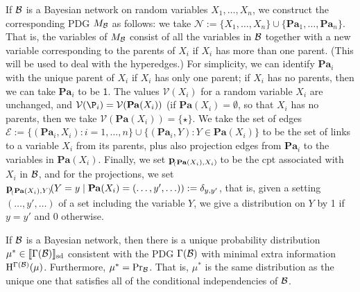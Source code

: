 \documentclass{article}
\DeclarePairedDelimiter{\SD}{\llbracket}{\rrbracket_{\text{sd}}}
\newcommand{\bp}[1][L]{\mat{p}_{\!_#1\!}}
\newcommand{\V}{\mathcal V}
\newcommand{\N}{\mathcal N}
\newcommand{\Ed}{\mathcal E}
\newcommand\Pa{\mathbf{Pa}}
\numberwithin{equation}{section}
\begin{document}
	\begin{defn}\label{def:bn2PDG}
		If $\cal B$ is a Bayesian network on random variables
    $X_1, \ldots, X_n$, we construct the corresponding PDG $M_{\cal B}$ 
                as follows: we take $\N := \{X_1, \ldots, X_n \} \cup
                \{ \Pa_1, \ldots, \Pa_n\}$.  
  That is, the variables of $M_{\cal B}$ consist of all the variables in
${\cal B}$ together with a new variable corresponding to the parents
of $X_i$ if $X_i$ has more than one parent.  (This will be used to
deal with the hyperedges.)  For simplicity, we can identify $\Pa_i$ with
the unique parent of $X_i$ if $X_i$ has only one parent; if $X_i$ has
no parents, then we can take $\Pa_i$ to be $\mathsf 1$.   
                The values $\V(X_i)$ for a random variable
                $X_i$ are unchanged, 
and $\V(\P_i) = \V(\Pa(X_i))$ (if $\Pa(X_i) = \emptyset$, so that
$X_i$ has no parents, then we take $\V(\Pa(X_i)) = \{\star\}$.                   %
We take the set of edges $\Ed := \{ (\Pa_i, X_i) :
                i = 1, \ldots, n \} \cup \{ (\Pa_i, Y) : Y \in
                \Pa(X_i)\}$ to be the set of links to a variable $X_i$
                from its parents, plus also projection edges from
$\Pa_i$ to the variables in $\Pa(X_i)$.  
		Finally, we set $\bp[(\Pa(X_i), X_i)]$ to be the cpt associated with $X_i$ in $\cal B$, and for the projections, we set $\bp[(\Pa(X_i), Y)](Y = y \mid \Pa(X_i) = (\ldots, y', \ldots)) := \delta_{y,y'}$, that is, given a setting $(\ldots, y', \ldots)$ of a set including the variable $Y$, we give a distribution on $Y$ by  1 if $y = y'$ and 0 otherwise.
	\end{defn}
	
	
	\begin{theorem}[restate=thmbnsRpdgs]\label{thm:bns-are-pdgs}
		If $\cal B$ is a Bayesian network, then there is a
                unique probability distribution $\mu^* \in
                \SD{\Gamma(\mathcal B)}$ consistent with the PDG
                $\Gamma(\cal B)$ with minimal extra information
                $\mathrm{H}^{\Gamma(\mathcal B)}(\mu)$. Furthermore, $\mu^* =
                \Pr_{\cal B}$. That is, $\mu^*$ is the same
                distribution as the unique one that satisfies all of
                the conditional independencies of $\cal B$.	 
	\end{theorem}
\end{document}

